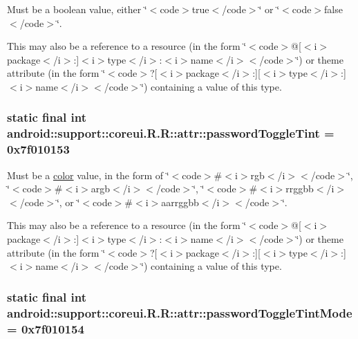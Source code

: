 Must be a boolean value, either \char`\"{}$<$code$>$true$<$/code$>$\char`\"{} or \char`\"{}$<$code$>$false$<$/code$>$\char`\"{}. 

This may also be a reference to a resource (in the form \char`\"{}$<$code$>$@\mbox{[}$<$i$>$package$<$/i$>$:\mbox{]}$<$i$>$type$<$/i$>$:$<$i$>$name$<$/i$>$$<$/code$>$\char`\"{}) or theme attribute (in the form \char`\"{}$<$code$>$?\mbox{[}$<$i$>$package$<$/i$>$:\mbox{]}\mbox{[}$<$i$>$type$<$/i$>$:\mbox{]}$<$i$>$name$<$/i$>$$<$/code$>$\char`\"{}) containing a value of this type. \hypertarget{classandroid_1_1support_1_1coreui_1_1_r_1_1attr_b8dfda41f050a139f83711242a1179e4}{
\subsubsection[{passwordToggleTint}]{\setlength{\rightskip}{0pt plus 5cm}static final int android::support::coreui.R.R::attr::passwordToggleTint = 0x7f010153}}
\label{classandroid_1_1support_1_1coreui_1_1_r_1_1attr_b8dfda41f050a139f83711242a1179e4}


Must be a \hyperlink{classandroid_1_1support_1_1coreui_1_1_r_1_1color}{color} value, in the form of \char`\"{}$<$code$>$\#$<$i$>$rgb$<$/i$>$$<$/code$>$\char`\"{}, \char`\"{}$<$code$>$\#$<$i$>$argb$<$/i$>$$<$/code$>$\char`\"{}, \char`\"{}$<$code$>$\#$<$i$>$rrggbb$<$/i$>$$<$/code$>$\char`\"{}, or \char`\"{}$<$code$>$\#$<$i$>$aarrggbb$<$/i$>$$<$/code$>$\char`\"{}. 

This may also be a reference to a resource (in the form \char`\"{}$<$code$>$@\mbox{[}$<$i$>$package$<$/i$>$:\mbox{]}$<$i$>$type$<$/i$>$:$<$i$>$name$<$/i$>$$<$/code$>$\char`\"{}) or theme attribute (in the form \char`\"{}$<$code$>$?\mbox{[}$<$i$>$package$<$/i$>$:\mbox{]}\mbox{[}$<$i$>$type$<$/i$>$:\mbox{]}$<$i$>$name$<$/i$>$$<$/code$>$\char`\"{}) containing a value of this type. \hypertarget{classandroid_1_1support_1_1coreui_1_1_r_1_1attr_f1135819a13e9553b43076c93eac8e5b}{
\subsubsection[{passwordToggleTintMode}]{\setlength{\rightskip}{0pt plus 5cm}static final int android::support::coreui.R.R::attr::passwordToggleTintMode = 0x7f010154}}
\label{classandroid_1_1support_1_1coreui_1_1_r_1_1attr_f1135819a13e9553b43076c93eac8e5b}


